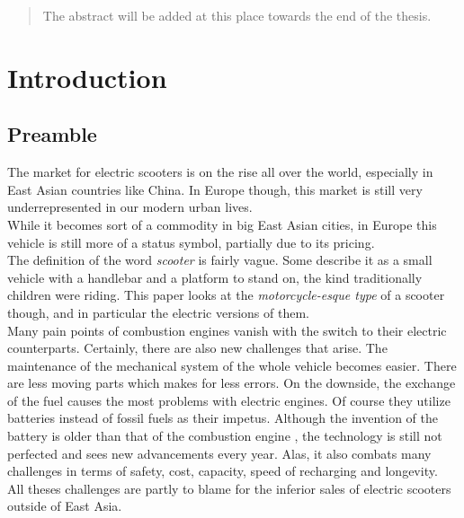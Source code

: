 \documentclass[12pt,a4paper]{report}
\begin{document}



\begin{abstract}

The abstract will be added at this place towards the end of the thesis.

\end{abstract}


\tableofcontents



\chapter{Introduction} \label{chap:intro}


\section{Preamble}

The market for electric scooters is on the rise all over the world,
especially in East Asian countries like China. \cn
In Europe though, this market is still very underrepresented in our modern urban lives.\\
While it becomes sort of a commodity in big East Asian cities, in Europe this vehicle
is still more of a status symbol, partially due to its pricing.\cn \\
The definition of the word \emph{scooter} is fairly vague.
Some describe it as a small vehicle with a handlebar and a platform to stand on,
the kind traditionally children were riding.
This paper looks at the \emph{motorcycle-esque type} of a scooter though, and in
particular the electric versions of them.\\
Many pain points of combustion engines vanish with the switch to their electric
counterparts. Certainly, there are also new challenges that arise.
The maintenance of the mechanical system of the whole vehicle becomes easier.
There are less moving parts which makes for less errors.
On the downside, the exchange of the fuel causes the most problems with electric engines.
Of course they utilize batteries instead of fossil fuels as their impetus.
Although the invention of the battery is older than that of the
combustion engine \cn, the technology is still not perfected and sees new
advancements every year. Alas, it also combats many challenges in terms of
safety, cost, capacity, speed of recharging and longevity.\\
All theses challenges are partly to blame for the inferior sales of electric scooters
outside of East Asia. \cn
\end{document}
